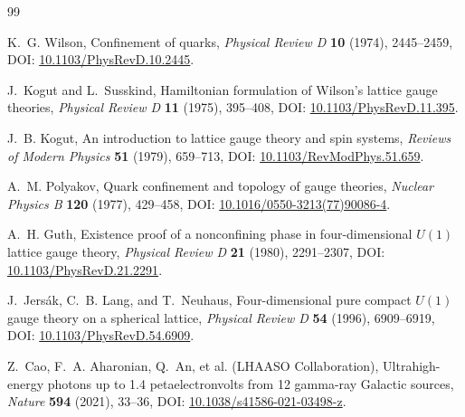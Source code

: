 \documentclass[11pt]{article}
\theoremstyle{definition}
\theoremstyle{plain}
\theoremstyle{remark}
\begin{document}
        \begin{thebibliography}{99}
            
            K.~G. Wilson,
            \newblock Confinement of quarks,
            \newblock \emph{Physical Review D} \textbf{10} (1974), 2445--2459,
            \newblock DOI: \href{https://doi.org/10.1103/PhysRevD.10.2445}{10.1103/PhysRevD.10.2445}.

            J.~Kogut and L.~Susskind,
            \newblock Hamiltonian formulation of Wilson's lattice gauge theories,
            \newblock \emph{Physical Review D} \textbf{11} (1975), 395--408,
            \newblock DOI: \href{https://doi.org/10.1103/PhysRevD.11.395}{10.1103/PhysRevD.11.395}.

            J.~B. Kogut,
            \newblock An introduction to lattice gauge theory and spin systems,
            \newblock \emph{Reviews of Modern Physics} \textbf{51} (1979), 659--713,
            \newblock DOI: \href{https://doi.org/10.1103/RevModPhys.51.659}{10.1103/RevModPhys.51.659}.

            A.~M. Polyakov,
            \newblock Quark confinement and topology of gauge theories,
            \newblock \emph{Nuclear Physics B} \textbf{120} (1977), 429--458,
            \newblock DOI: \href{https://doi.org/10.1016/0550-3213(77)90086-4}{10.1016/0550-3213(77)90086-4}.

            A.~H. Guth,
            \newblock Existence proof of a nonconfining phase in four-dimensional
            \(U(1)\) lattice gauge theory,
            \newblock \emph{Physical Review D} \textbf{21} (1980), 2291--2307,
            \newblock DOI: \href{https://doi.org/10.1103/PhysRevD.21.2291}{10.1103/PhysRevD.21.2291}.

            J.~Jers\'ak, C.~B. Lang, and T.~Neuhaus,
            \newblock Four-dimensional pure compact \(U(1)\) gauge theory on a spherical lattice,
            \newblock \emph{Physical Review D} \textbf{54} (1996), 6909--6919,
            \newblock DOI: \href{https://doi.org/10.1103/PhysRevD.54.6909}{10.1103/PhysRevD.54.6909}.

            Z.~Cao, F.~A. Aharonian, Q.~An, et al. (LHAASO Collaboration),
            \newblock Ultrahigh-energy photons up to 1.4 petaelectronvolts from 12
            gamma-ray Galactic sources,
            \newblock \emph{Nature} \textbf{594} (2021), 33--36,
            \newblock DOI: \href{https://doi.org/10.1038/s41586-021-03498-z}{10.1038/s41586-021-03498-z}.


\end{thebibliography}
\end{document}
